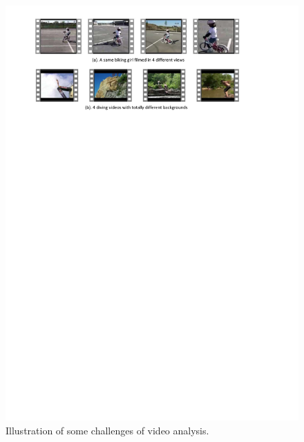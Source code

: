 \begin{figure}
	\includegraphics[trim=2cm 22cm 0cm 1cm]{fig01/challenges.pdf}
	\caption{Illustration of some challenges of video analysis. }
	\label{fig:challenges}
\end{figure}


